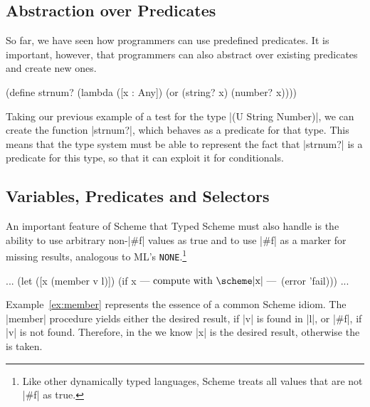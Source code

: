 \begin{schemeregion}
\subsection{Abstraction over Predicates}

So far, we have seen how programmers can use predefined predicates.
It is important, however, that programmers can also abstract over
existing predicates and create new ones.  

\begin{exmp}
\begin{schemedisplay}
(define strnum?
  (lambda ([x : Any])
    (or (string? x) (number? x))))
\end{schemedisplay}
  \label{ex:strnum}
\end{exmp}
\noindent
Taking our
previous example of a test for the type \scheme|(U String Number)|, we
can create the function \scheme|strnum?|, which behaves as a predicate
for that type.
This means that the type system must be able to represent the fact
that \scheme|strnum?| is a predicate for this type, so that it
can exploit it for conditionals.

\subsection{Variables, Predicates and Selectors}

An important feature of Scheme that Typed Scheme must also handle is the
ability to use arbitrary non-\scheme|#f| values as true and to
use  \scheme|#f| as a marker for missing results, analogous to 
 ML's {\texttt{NONE}}.\footnote{Like other dynamically typed
   languages, Scheme treats all values that are not \scheme|#f| as
    true.}  

\begin{exmp}
\begin{schemedisplay}
... (let ([x (member v l)])
      (if x
          $\text{---  compute with \scheme|x|  ---}$
          (error 'fail))) ...
\end{schemedisplay}
\label{ex:member}
\end{exmp}
\noindent
Example~\ref{ex:member} represents the essence of a common
Scheme idiom.
The \scheme|member| procedure yields either the desired result, if
\scheme|v| is found in \scheme|l|, or \scheme|#f|, if \scheme|v| is not
found.  Therefore, in the \tbranch we know
\scheme|x| is the desired result, otherwise the \ebranch
is taken. 


\end{schemeregion}
